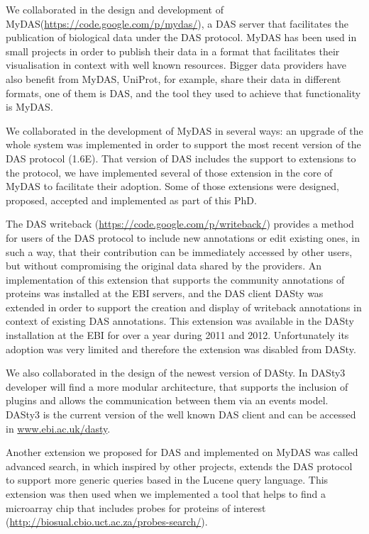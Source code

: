 We collaborated in the design and development of MyDAS(\url{https://code.google.com/p/mydas/}), a DAS server that facilitates the publication of biological data under the DAS protocol. MyDAS has been used in small projects in order to publish their data in a format that facilitates their visualisation in context with well known resources. Bigger data providers have also benefit from MyDAS, UniProt, for example, share their data in different formats, one of them is DAS, and the tool they used to achieve that functionality is MyDAS.

We collaborated in the development of MyDAS in several ways: an upgrade of the whole system was implemented in order to support the most recent version of the DAS protocol (1.6E). That version of DAS includes the support to extensions to the protocol, we have implemented several of those extension in the core of MyDAS to facilitate their adoption. Some of those extensions were designed, proposed, accepted and implemented as part of this PhD. 

The DAS writeback (\url{https://code.google.com/p/writeback/}) provides a method for users of the DAS protocol to include new annotations or edit existing ones, in such a way, that their contribution can be immediately accessed by other users, but without compromising the original data shared by the providers. An implementation of this extension that supports the community annotations of proteins was installed at the EBI servers, and the DAS client DASty was extended in order to support the creation and display of writeback annotations in context of existing DAS annotations. This extension was available in the DASty installation at the EBI for over a year during 2011 and 2012. Unfortunately its adoption was very limited and therefore the extension was disabled from DASty.

We also collaborated in the design of the newest version of DASty. In DASty3 developer will find a more modular architecture, that supports the inclusion of plugins and allows the communication between them via an events model. DASty3 is the current version of the well known DAS client and can be accessed in \url{www.ebi.ac.uk/dasty}.

Another extension we proposed for DAS and implemented on MyDAS was called advanced search, in which inspired by other projects, extends the DAS  protocol to support more generic queries based in the Lucene query language. This extension was then used when we implemented a tool that helps to find a microarray chip that includes probes for proteins of interest (\url{http://biosual.cbio.uct.ac.za/probes-search/}).

